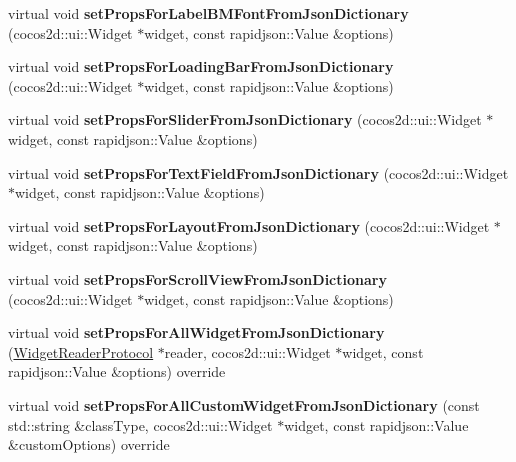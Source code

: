\begin{DoxyCompactItemize}
\item 
\mbox{\label{classcocostudio_1_1WidgetPropertiesReader0250_a7285cb15dfc0102574a8b5ad472a339a}} 
virtual void {\bfseries set\+Props\+For\+Label\+B\+M\+Font\+From\+Json\+Dictionary} (cocos2d\+::ui\+::\+Widget $\ast$widget, const rapidjson\+::\+Value \&options)
\item 
\mbox{\label{classcocostudio_1_1WidgetPropertiesReader0250_a0b8adc4e3ff7f61598bf88d125e04c38}} 
virtual void {\bfseries set\+Props\+For\+Loading\+Bar\+From\+Json\+Dictionary} (cocos2d\+::ui\+::\+Widget $\ast$widget, const rapidjson\+::\+Value \&options)
\item 
\mbox{\label{classcocostudio_1_1WidgetPropertiesReader0250_a04333d9207b7c6bcff1017fde00d1099}} 
virtual void {\bfseries set\+Props\+For\+Slider\+From\+Json\+Dictionary} (cocos2d\+::ui\+::\+Widget $\ast$widget, const rapidjson\+::\+Value \&options)
\item 
\mbox{\label{classcocostudio_1_1WidgetPropertiesReader0250_a172102b027bfe646e3dff0dea3618706}} 
virtual void {\bfseries set\+Props\+For\+Text\+Field\+From\+Json\+Dictionary} (cocos2d\+::ui\+::\+Widget $\ast$widget, const rapidjson\+::\+Value \&options)
\item 
\mbox{\label{classcocostudio_1_1WidgetPropertiesReader0250_a3f15f54a5aa77eb662ecad231e82a3fb}} 
virtual void {\bfseries set\+Props\+For\+Layout\+From\+Json\+Dictionary} (cocos2d\+::ui\+::\+Widget $\ast$widget, const rapidjson\+::\+Value \&options)
\item 
\mbox{\label{classcocostudio_1_1WidgetPropertiesReader0250_a00198cd6a98d8942a2b2e469a09fd439}} 
virtual void {\bfseries set\+Props\+For\+Scroll\+View\+From\+Json\+Dictionary} (cocos2d\+::ui\+::\+Widget $\ast$widget, const rapidjson\+::\+Value \&options)
\item 
\mbox{\label{classcocostudio_1_1WidgetPropertiesReader0250_a54e08c0b32e8dfd04e4e48a2ecc45796}} 
virtual void {\bfseries set\+Props\+For\+All\+Widget\+From\+Json\+Dictionary} (\hyperlink{classcocostudio_1_1WidgetReaderProtocol}{Widget\+Reader\+Protocol} $\ast$reader, cocos2d\+::ui\+::\+Widget $\ast$widget, const rapidjson\+::\+Value \&options) override
\item 
\mbox{\label{classcocostudio_1_1WidgetPropertiesReader0250_ad2f07c09ca470612e760c50210a2818b}} 
virtual void {\bfseries set\+Props\+For\+All\+Custom\+Widget\+From\+Json\+Dictionary} (const std\+::string \&class\+Type, cocos2d\+::ui\+::\+Widget $\ast$widget, const rapidjson\+::\+Value \&custom\+Options) override
\end{DoxyCompactItemize}
